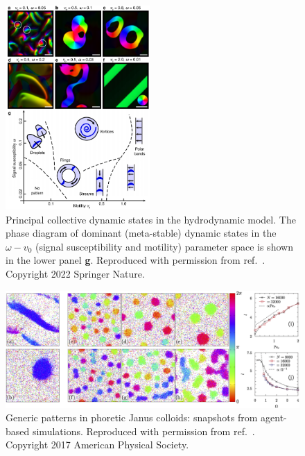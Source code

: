 \documentclass[a4paper, amsfonts, amssymb, amsmath, reprint, showkeys, showpacs, nofootinbib, twoside]{revtex4-2}
\begin{document}
\begin{figure}
    \includegraphics[width=0.49\textwidth]{./figs/chemoBehaviors2.png}
    \caption{
        \label{fig:chemoBehaviors2} Principal collective dynamic states in the hydrodynamic model.
        The phase diagram of dominant (meta-stable) dynamic states in the $\omega-v_0$ (signal susceptibility and motility) parameter space is shown in the lower panel \textbf{g}.
        Reproduced with permission from ref.~\cite{Ziepke2022}. Copyright 2022 Springer Nature.
    }
\end{figure}

\begin{figure}
    \includegraphics[width=\textwidth]{./figs/capBehaviors1.png}
    \caption{
        \label{fig:capBehaviors1} Generic patterns in phoretic Janus colloids: snapshots from agent-based simulations.
        Reproduced with permission from ref.~\cite{PhysRevLett.118.268001}. Copyright 2017 American Physical Society.
    }
\end{figure}
\end{document}
